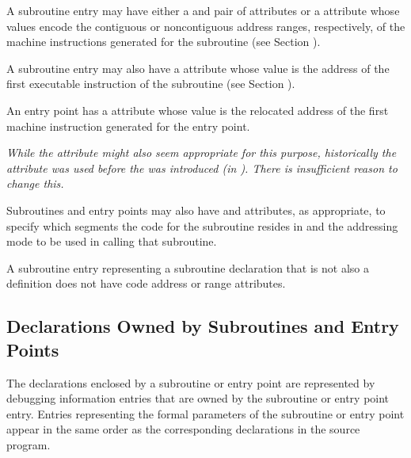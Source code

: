 A subroutine entry may have either a \DWATlowpc{} and
\DWAThighpc{} pair of attributes or a \DWATranges{} attribute
whose 
values 
encode the contiguous or non\dash contiguous address
ranges, respectively, of the machine instructions generated
for the subroutine (see 
Section ).

A 
\hypertarget{chap:DWATentrypcentryaddressofsubprogram}{}
subroutine entry may also have 
a 
\DWATentrypc{} attribute
whose value is the address of the first executable instruction
of the subroutine (see 
Section ).

An entry point has a \DWATlowpc{} attribute whose value is the
relocated address of the first machine instruction generated
for the entry point.

\textit{While the 
\DWATentrypc{} attribute 
might 
also seem appropriate
for this purpose, historically the 
\DWATlowpc{} attribute
was used before the 
\DWATentrypc{} was introduced (in
). 
There is insufficient reason to change this.}


Subroutines 
and 
entry
points 
\hypertarget{chap:DWATaddressclasssubroutineorsubroutinetype}{}
may also have 
\DWATsegment{} 
and
\DWATaddressclassDEFN{} attributes,
as appropriate, to specify
which segments the code for the subroutine resides in and
the addressing mode to be used in calling that subroutine.

A subroutine entry representing a subroutine declaration
that is not also a definition does not have code address or
range attributes.


\subsection{Declarations Owned by Subroutines and Entry Points} 
\label{chap:declarationsownedbysubroutinesandentrypoints}
The declarations enclosed by a subroutine or entry point are
represented by debugging information entries that are owned
by the subroutine or entry point entry. Entries representing
the formal parameters of the subroutine or entry point appear
in the same order as the corresponding declarations in the
source program.

